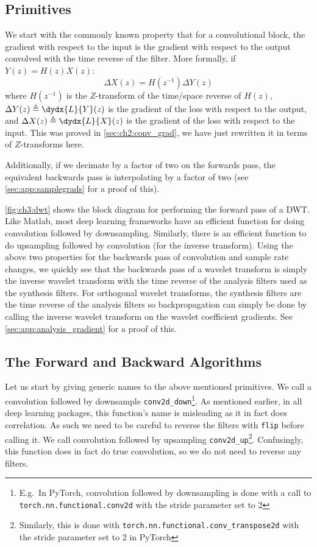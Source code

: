 \subsection{Primitives}
We start with the commonly known property that for a convolutional block, the
gradient with respect to the input is the gradient with respect to the output
convolved with the time reverse of the filter. More formally, if 
$Y(z) = H(z) X(z)$:
%
\begin{equation}\label{eq:ch3:backprop}
  \Delta X(z) = H(z^{-1}) \Delta Y(z)
\end{equation}
%
where $H(z^{-1})$ is the $Z$-transform of the time/space reverse of $H(z)$,
$\Delta Y(z) \triangleq \dydx{L}{Y}(z)$ is the gradient of the loss with respect
to the output, and $\Delta X(z) \triangleq \dydx{L}{X}(z)$ is the gradient of
the loss with respect to the input. This was proved in \autoref{sec:ch2:conv_grad}, we 
have just rewritten it in terms of $Z$-transforms here.

Additionally, if we decimate by a factor of two on the forwards pass, the
equivalent backwards pass is interpolating by a factor of two (see \autoref{sec:app:samplegrads}
for a proof of this).

\autoref{fig:ch3:dwt} shows the block diagram for performing the forward pass of
a DWT. 
Like Matlab, most deep learning frameworks have an efficient function for
doing convolution followed by downsampling. Similarly, there is an efficient
function to do upsampling followed by convolution (for the inverse transform).
Using the above two properties for the backwards pass of convolution and sample
rate changes, we quickly see that the backwards pass of a wavelet transform is
simply the inverse wavelet transform with the time reverse of the analysis
filters used as the synthesis filters. For orthogonal wavelet transforms, the
synthesis filters are the time reverse of the analysis filters so
backpropagation can simply be done by calling the inverse wavelet transform on
the wavelet coefficient gradients. See \autoref{sec:app:analysis_gradient} for a
proof of this.

\subsection{The Forward and Backward Algorithms}
Let us start by giving generic names to the above mentioned primitives. We call
a convolution followed by downsample \texttt{conv2d_down}\footnote{E.g.\ In
PyTorch, convolution followed by downsampling is done with a call to
\texttt{torch.nn.functional.conv2d} with the stride parameter set to 2}. As
mentioned earlier, in all deep learning packages, this function's name is misleading as
it in fact does correlation. As such we need to be careful to reverse the
filters with \texttt{flip} before calling it. We call convolution followed by
upsampling \texttt{conv2d_up}\footnote{Similarly, this is done with 
\texttt{torch.nn.functional.conv_transpose2d} with the stride parameter set to
2 in PyTorch}. Confusingly, this function does in fact do true convolution, so
we do not need to reverse any filters. 

